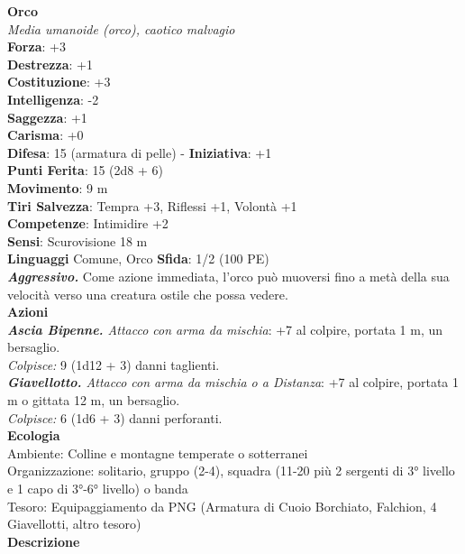 \begin{multicols}{2}
\medskip\textbf{Orco}\\
\emph{Media umanoide (orco), caotico malvagio}\\
\textbf{Forza}: +3\\
\textbf{Destrezza}: +1\\
\textbf{Costituzione}: +3\\
\textbf{Intelligenza}: -2\\
\textbf{Saggezza}: +1\\
\textbf{Carisma}: +0\\
\textbf{Difesa}: 15 (armatura di pelle) - \textbf{Iniziativa}: +1\\
\textbf{Punti Ferita}: 15 (2d8 + 6)\\
\textbf{Movimento}: 9 m\\
\textbf{Tiri Salvezza}: Tempra +3, Riflessi +1, Volontà +1\\
\textbf{Competenze}: Intimidire +2\\
\textbf{Sensi}: Scurovisione 18 m\\
\textbf{Linguaggi} Comune, Orco \textbf{Sfida}: 1/2 (100 PE)\smallskip\\
\emph{\textbf{Aggressivo.}} Come azione immediata, l'orco può muoversi fino a metà della sua velocità verso una creatura ostile che possa vedere. \\
\smallskip\textbf{Azioni}\\
\emph{\textbf{Ascia Bipenne.} Attacco con arma da mischia}: +7 al colpire, portata 1 m, un bersaglio.\\
\emph{Colpisce:} 9 (1d12 + 3) danni taglienti.\\
\emph{\textbf{Giavellotto.} Attacco con arma da mischia o a Distanza}: +7 al colpire, portata 1 m o gittata 12 m, un bersaglio. \\
\emph{Colpisce:} 6 (1d6 + 3) danni perforanti.\\
\textbf{Ecologia}\\
Ambiente: Colline e montagne temperate o sotterranei\\
Organizzazione: solitario, gruppo (2-4), squadra (11-20 più 2 sergenti di 3° livello e 1 capo di 3°-6° livello) o banda \\
Tesoro: Equipaggiamento da PNG (Armatura di Cuoio Borchiato, Falchion, 4 Giavellotti, altro tesoro)\\
\textbf{Descrizione}\\

\end{multicols}
